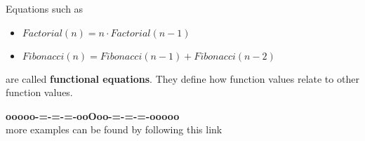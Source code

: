 \documentclass{ximera}
\begin{document}
Equations such as

\begin{itemize}
\item $Factorial(n) = n \cdot Factorial(n-1)$
\item $Fibonacci(n) = Fibonacci(n-1) + Fibonacci(n-2)$
\end{itemize}

are called \textbf{functional equations}.  They define how function values relate to other function values.




















\begin{onlineOnly}
\begin{center}
\textbf{\textcolor{green!50!black}{ooooo-=-=-=-ooOoo-=-=-=-ooooo}} \\

more examples can be found by following this link\\ 

\end{center}
\end{onlineOnly}
\end{document}
